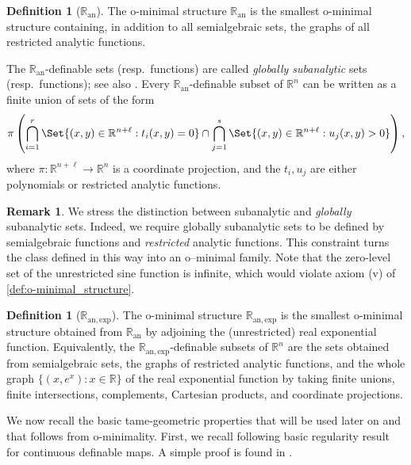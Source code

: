 \documentclass[a4paper,11pt,reqno]{amsart}
\theoremstyle{plain}
\newtheorem{lemma}[theorem]{Lemma}
\theoremstyle{definition}
\newtheorem{definition}[theorem]{Definition}
\newtheorem{remark}[theorem]{Remark}
\newcommand{\R}{\mathbb R}
\newcommand{\Ran}{\mathbb R_{\mathrm{an}}}
\newcommand{\Ranexp}{\mathbb R_{\mathrm{an,exp}}}
\begin{document}
\begin{definition}[$\Ran$]
The o-minimal structure $\Ran$ is the smallest o-minimal structure containing, in addition to all semialgebraic sets, the graphs of all restricted analytic functions. 
\end{definition}

The $\Ran$-definable sets (resp.\ functions) are called \emph{globally subanalytic} sets (resp.\ functions); see also \cite[Section~1.1]{MR2769219}. Every $\Ran$-definable subset of $\R^n$ can be written as a finite union of sets of the form
\[
\pi\left(
\bigcap_{i=1}^r \Set{(x,y)\in\R^{n+\ell}: t_i(x,y)=0}
\cap
\bigcap_{j=1}^s \Set{(x,y)\in\R^{n+\ell}: u_j(x,y)>0}
\right),
\]
where $\pi:\R^{n+\ell}\to\R^n$ is a coordinate projection, and the $t_i,u_j$ are either polynomials or restricted analytic functions.

\begin{remark} \label{rem:ran}
    We stress the distinction between subanalytic and \emph{globally} subanalytic sets. Indeed, we require globally subanalytic sets to be defined by semialgebraic functions and \emph{restricted} analytic functions. This constraint turns the class defined in this way into an o--minimal family. Note that the zero-level set of the unrestricted sine function is infinite, which would violate axiom (v) of \cref{def:o-minimal_structure}.
\end{remark}

\begin{definition}[$\Ranexp$]
    The o-minimal structure $\Ranexp$ is the smallest o-minimal structure obtained from $\Ran$ by adjoining the (unrestricted) real exponential function. Equivalently, the $\Ranexp$-definable subsets of $\R^n$ are the sets obtained from semialgebraic sets, the graphs of restricted analytic functions, and the  whole graph $\{(x,e^x) : x\in \R\}$ of the real exponential function   by taking finite unions, finite intersections, complements, Cartesian products, and coordinate projections.
\end{definition}

We now recall the basic tame-geometric properties that will be used later on and that follows from o-minimality. 
First, we recall following basic regularity result for continuous definable maps. A simple proof is found in \cite[Lemma 7.6]{MR2823973}.
\end{document}
